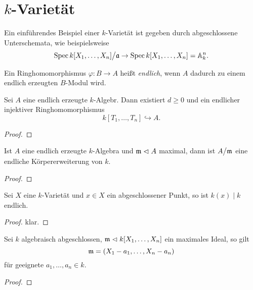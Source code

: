 \section{$k$-Varietät} %

\begin{beispiel}
    Ein einführendes Beispiel einer $k$-Varietät ist gegeben durch
    abgeschlossene Unterschemata, wie beispielsweise
    \[ \operatorname{Spec} k[X_1,\ldots,X_n] \big/\mathfrak{a} \to \operatorname{Spec} k[X_1,\ldots,X_n] = \mathbb{A}^n_k.\]
\end{beispiel}


\begin{definition}[endlich]
    \label{def:ringhom endlich}
    Ein Ringhomomorphismus $\varphi: B \to A$ heißt \emph{endlich},
    wenn $A$ dadurch zu einem endlich erzeugten $B$-Modul wird.
\end{definition}

\begin{satz}
    Sei $A$ eine endlich erzeugte $k$-Algebr. Dann existiert $d\geq 0$ und
    ein endlicher injektiver Ringhomomorphismus
    \[k[T_1,\ldots,T_n] \hookrightarrow A.\]
\end{satz}
\begin{proof}
\TODO
\end{proof}

\begin{korollar}
    Ist $A$ eine endlich erzeugte $k$-Algebra und $\mathfrak{m} \vartriangleleft A$ maximal,
    dann ist $A\big/\mathfrak{m}$ eine endliche Körpererweiterung von $k$.
\end{korollar}
\begin{proof}
\TODO
\end{proof}

\begin{korollar}
    Sei $X$ eine $k$-Varietät und $x\in X$ ein abgeschlossener Punkt, so ist
    $k(x)\mid k$ endlich.
\end{korollar}
\begin{proof}
klar.
\end{proof}

\begin{satz}
    Sei $k$ algebraisch abgeschlossen, $\mathfrak{m}\vartriangleleft k[X_1,\ldots,X_n]$ ein
    maximales Ideal, so gilt
    \[\mathfrak{m} = (X_1-a_1,\ldots,X_n-a_n)\]
    für geeignete $a_1,\ldots,a_n \in k$.
\end{satz}
\begin{proof}
\TODO
\end{proof}


